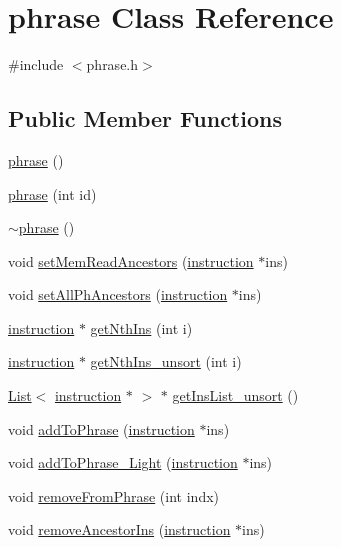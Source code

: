 \hypertarget{classphrase}{
\section{phrase Class Reference}
\label{classphrase}
}


{\ttfamily \#include $<$phrase.h$>$}

\subsection*{Public Member Functions}
\begin{DoxyCompactItemize}
\item 
\hyperlink{classphrase_a5439a7d7df8363555af7cb2746f05f54}{phrase} ()
\item 
\hyperlink{classphrase_a8df8c428377443398960bf7332a20248}{phrase} (int id)
\item 
\hyperlink{classphrase_a56e851a378479e92c1428e1c8a21018a}{$\sim$phrase} ()
\item 
void \hyperlink{classphrase_a486ed90f05206280c5a03441acd3f181}{setMemReadAncestors} (\hyperlink{classinstruction}{instruction} $\ast$ins)
\item 
void \hyperlink{classphrase_a6e02c8bca1014c332e8d137be57193a4}{setAllPhAncestors} (\hyperlink{classinstruction}{instruction} $\ast$ins)
\item 
\hyperlink{classinstruction}{instruction} $\ast$ \hyperlink{classphrase_a724c3f11701e830eb5b10be7b62476d5}{getNthIns} (int i)
\item 
\hyperlink{classinstruction}{instruction} $\ast$ \hyperlink{classphrase_adc61714187e77bc7c1ff2054b2312749}{getNthIns\_\-unsort} (int i)
\item 
\hyperlink{classList}{List}$<$ \hyperlink{classinstruction}{instruction} $\ast$ $>$ $\ast$ \hyperlink{classphrase_acc24a3eb40ef0fbccecaca50ebe3fd81}{getInsList\_\-unsort} ()
\item 
void \hyperlink{classphrase_a747fdf8e7ac40b4bad71d20129ae0e73}{addToPhrase} (\hyperlink{classinstruction}{instruction} $\ast$ins)
\item 
void \hyperlink{classphrase_afcb54ecdecbf37e7395ac8dcc7019592}{addToPhrase\_\-Light} (\hyperlink{classinstruction}{instruction} $\ast$ins)
\item 
void \hyperlink{classphrase_a3eaff820376bfb18d2a2566dba447980}{removeFromPhrase} (int indx)
\item 
void \hyperlink{classphrase_ab4c978f51c02eb688ecd0d32245c09b5}{removeAncestorIns} (\hyperlink{classinstruction}{instruction} $\ast$ins)

\end{DoxyCompactItemize}
